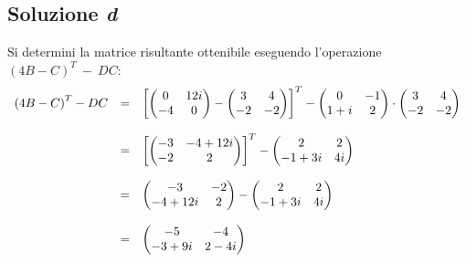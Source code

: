 \documentclass[a4paper]{article}
\makeatletter
\newenvironment{rowequmat}[1]{\left(\array{@{}#1@{}}}{\endarray\right)}
\makeatother
\begin{document}
	\subsection{Soluzione \emph{d}}
	
	Si determini la matrice risultante ottenibile eseguendo l'operazione $\left(4B-C\right)^{T}~-~DC$:
	\begin{equation*}
		\begin{array}{lll}
			\left(4B-C\right)^{T}-DC &=&
			\left[
			\begin{rowequmat}{cc}
				0  & 12i \\
				-4 & 0
			\end{rowequmat} - \begin{rowequmat}{cc}
				3 & 4 \\
				-2 & -2
			\end{rowequmat}
			\right]^{T} -
			\begin{rowequmat}{cc}
				0 & -1 \\
				1+i & 2
			\end{rowequmat}	\cdot
			\begin{rowequmat}{cc}
				3 & 4 \\
				-2 & -2
			\end{rowequmat} \\
			\\ %
			&=& \left[
			\begin{rowequmat}{cc}
				-3 & -4+12i \\
				-2 & 2
			\end{rowequmat}
			\right]^{T} - 
			\begin{rowequmat}{cc}
				2 & 2 \\
				-1+3i & 4i
			\end{rowequmat} \\
			\\ %
			&=& \begin{rowequmat}{cc}
				-3 & -2 \\
				-4+12i & 2
			\end{rowequmat} - \begin{rowequmat}{cc}
				2 & 2 \\
				-1+3i & 4i
			\end{rowequmat} \\
			\\ %
			&=& \begin{rowequmat}{cc}
				-5 & -4 \\
				-3+9i & 2-4i
			\end{rowequmat}
		\end{array}
	\end{equation*}\newpage
	
\end{document}
